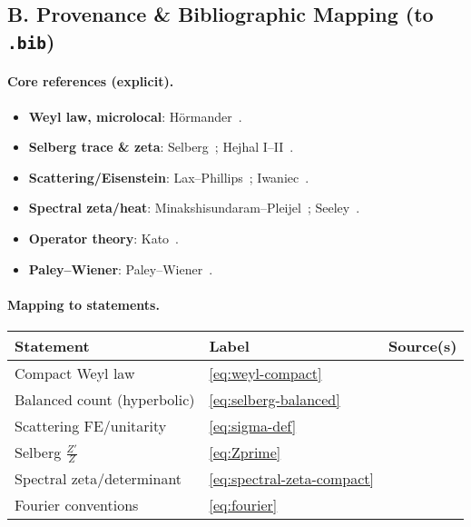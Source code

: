 
\subsection*{B. Provenance \& Bibliographic Mapping (to \texttt{.bib})}
\label{subsec:provenance}

\paragraph{Core references (explicit).}
\begin{itemize}
  \item \textbf{Weyl law, microlocal}: Hörmander~\cite{Hormander1968}.
  \item \textbf{Selberg trace \& zeta}: Selberg~\cite{Selberg1956}; Hejhal I–II~\cite{Hejhal1983,Hejhal1983II}.
  \item \textbf{Scattering/Eisenstein}: Lax–Phillips~\cite{LaxPhillips1976}; Iwaniec~\cite{Iwaniec2002}.
  \item \textbf{Spectral zeta/heat}: Minakshisundaram–Pleijel~\cite{Minakshisundaram1949}; Seeley~\cite{Seeley1967}.
  \item \textbf{Operator theory}: Kato~\cite{Kato}.
  \item \textbf{Paley–Wiener}: Paley–Wiener~\cite{PaleyWiener}.
\end{itemize}

\paragraph{Mapping to statements.}
\begin{center}
\renewcommand{\arraystretch}{1.15}
\begin{tabular}{lll}
\toprule
\textbf{Statement} & \textbf{Label} & \textbf{Source(s)} \\
\midrule
Compact Weyl law & \eqref{eq:weyl-compact} & \cite{Hormander1968} \\
Balanced count (hyperbolic) & \eqref{eq:selberg-balanced} & \cite{Selberg1956,Hejhal1983,Hejhal1983II,LaxPhillips1976} \\
Scattering FE/unitarity & \eqref{eq:sigma-def} & \cite{Hejhal1983II,LaxPhillips1976} \\
Selberg $\frac{Z'}{Z}$ & \eqref{eq:Zprime} & \cite{Selberg1956,Hejhal1983} \\
Spectral zeta/determinant & \eqref{eq:spectral-zeta-compact} & \cite{Minakshisundaram1949,Seeley1967} \\
Fourier conventions & \eqref{eq:fourier} & \cite{PaleyWiener} \\
\bottomrule
\end{tabular}
\end{center}

